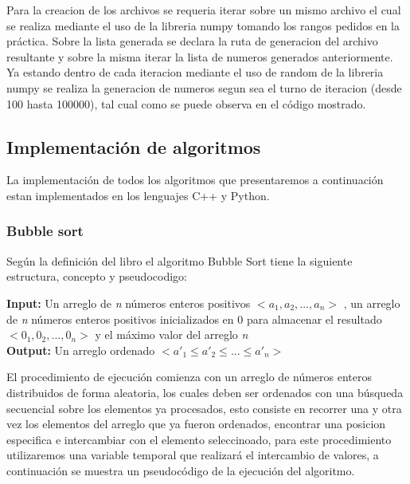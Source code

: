 \documentclass{article}
\begin{document}
			Para la creacion de los archivos se requeria iterar sobre un mismo archivo el cual se realiza mediante el uso de la libreria numpy tomando los rangos pedidos en la práctica. Sobre la lista generada se declara la ruta de generacion del archivo resultante y sobre la misma iterar la lista de numeros generados anteriormente.
			\\
			Ya estando dentro de cada iteracion mediante el uso de random de la libreria numpy se realiza la generacion de numeros segun sea el turno de iteracion (desde 100 hasta 100000), tal cual como se puede observa en el código mostrado.
    		
    		
		
		\subsection{Implementaci\'{o}n de algoritmos}
		    La implementaci\'{o}n de todos los algoritmos que presentaremos a continuación estan implementados en los lenguajes C++ y Python.
		    
		    
		        \subsubsection{Bubble sort} 
		        Según la definición del libro \cite{CLRS2009} el algoritmo Bubble Sort tiene la siguiente estructura, concepto y pseudocodigo:
		        
		            \begin{flushleft}
    		            \textbf{Input:} Un arreglo de \textit{n} números enteros positivos $<a_1,a_2,...,a_n>$ , un arreglo de \textit{n} números enteros positivos inicializados en 0 para almacenar el resultado $<0_1,0_2,...,0_n>$ y el máximo valor del arreglo \textit{n}  \\
    		            \textbf{Output:} Un arreglo ordenado $<a'_1 \leq a'_2 \leq ... \leq a'_n>$
		            \end{flushleft}
		            
		            El procedimiento de ejecución comienza con un arreglo de números enteros distribuidos de forma aleatoria, los cuales deben ser ordenados con una búsqueda secuencial sobre los elementos ya procesados, esto consiste en recorrer una y otra vez los elementos del arreglo que ya fueron ordenados, encontrar una posicion especifica e intercambiar con el elemento seleccinoado, para este procedimiento utilizaremos una variable temporal que realizará el intercambio de valores, a continuación se muestra un pseudocódigo de la ejecución del algoritmo.
		            
\end{document}
